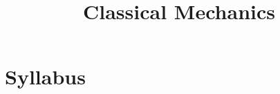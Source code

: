 \documentclass{notes}
\title{Classical Mechanics}
\begin{document}
\section*{Syllabus}
\end{document}
